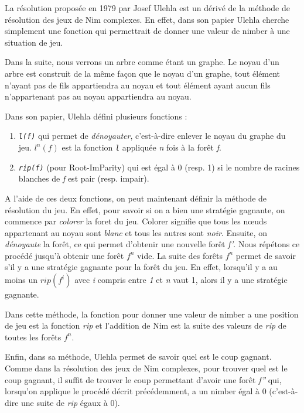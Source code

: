   La résolution proposée en 1979 par Josef Ulehla est un dérivé de la méthode de résolution des jeux de Nim complexes. En effet, dans son papier \cite{UleHack} Ulehla cherche simplement une fonction qui permettrait de donner une valeur de nimber à une situation de jeu.

  Dans la suite, nous verrons un arbre comme étant un graphe. Le noyau d'un arbre est construit de la même façon que le noyau d'un graphe, tout élément n'ayant pas de fils appartiendra au noyau et tout élément ayant aucun fils n'appartenant pas au noyau appartiendra au noyau.

  Dans son papier, Ulehla défini plusieurs fonctions :
  \begin{enumerate}
    \item \textit{\texttt{l(f)}} qui permet de \textit{dénoyauter}, c'est-à-dire enlever le noyau du graphe du jeu. $l^n(f)$ est la fonction \textit{\texttt{l}} appliquée \textit{n} fois à la forêt \textit{f}.
    \item\textit{\texttt{rip(f)}} (pour Root-ImParity) qui est égal à 0 (resp. 1) si le nombre de racines blanches de \textit{f} est pair (resp. impair).
  \end{enumerate}

  A l'aide de ces deux fonctions, on peut maintenant définir la méthode de résolution du jeu. En effet, pour savoir si on a bien une stratégie gagnante, on commence par \textit{colorer} la foret du jeu. Colorer signifie que tous les nœuds appartenant au noyau sont \textit{blanc} et tous les autres sont \textit{noir}. Ensuite, on \textit{dénoyaute} la forêt, ce qui permet d'obtenir une nouvelle forêt \textit{f'}. Nous répétons ce procédé jusqu’à obtenir une forêt $f^n$ vide. La suite des forêts $f^n$ permet de savoir s'il y a une stratégie gagnante pour la forêt du jeu. En effet, lorsqu'il y a au moins un $rip(f^i)$ avec \textit{i} compris entre \textit{1} et \textit{n} vaut 1, alors il y a une stratégie gagnante.

  Dans cette méthode, la fonction pour donner une valeur de nimber a une position de jeu est la fonction \textit{rip} et l'addition de Nim est la suite des valeurs de \textit{rip} de toutes les forêts $f^n$.

  Enfin, dans sa méthode, Ulehla permet de savoir quel est le coup gagnant. Comme dans la résolution des jeux de Nim complexes, pour trouver quel est le coup gagnant, il suffit de trouver le coup permettant d'avoir une forêt \textit{f''} qui, lorsqu'on applique le procédé décrit précédemment, a un nimber égal à 0 (c'est-à-dire une suite de \textit{rip} égaux à 0).

